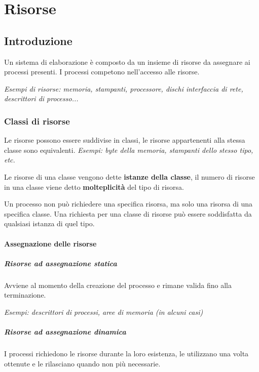 \chapter{Risorse}
\newpage

\section{Introduzione}
Un sistema di elaborazione è composto da un insieme di risorse da assegnare ai processi presenti.
I processi competono nell'accesso alle risorse.

\textit{Esempi di risorse: memoria, stampanti, processore, dischi
interfaccia di rete, descrittori di processo...}

\subsection{Classi di risorse}
Le risorse possono essere suddivise in classi, le risorse appartenenti alla stessa classe sono equivalenti.
\textit{Esempi: byte della memoria, stampanti dello stesso tipo, etc.}

Le risorse di una classe vengono dette \textbf{istanze della classe}, il numero di risorse in una classe viene detto \textbf{molteplicità} del tipo di risorsa.

Un processo non può richiedere una specifica risorsa, ma solo una risorsa di una specifica classe. Una richiesta per una classe di risorse può essere soddisfatta da qualsiasi istanza di quel tipo.

\subsubsection{Assegnazione delle risorse}
\paragraph{Risorse ad assegnazione statica}
Avviene al momento della creazione del processo e rimane valida fino alla terminazione.

\textit{Esempi: descrittori di processi, aree di memoria (in alcuni casi)}

\paragraph{Risorse ad assegnazione dinamica}
I processi richiedono le risorse durante la loro esistenza, le utilizzano una volta ottenute e le rilasciano quando non più necessarie.


